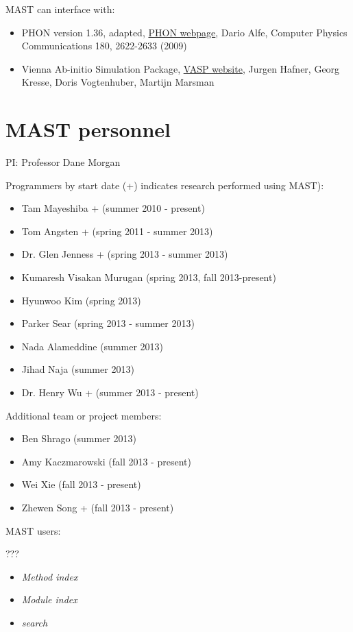 \documentclass[letterpaper,10pt,english]{sphinxmanual}
\begin{document}
MAST can interface with:
\begin{itemize}
\item {} 
PHON version 1.36, adapted, \href{http://www.homepages.ucl.ac.uk/~ucfbdxa/phon/phon.html}{PHON webpage}, Dario Alfe, Computer Physics Communications 180, 2622-2633 (2009)

\item {} 
Vienna Ab-initio Simulation Package, \href{https://www.vasp.at/}{VASP website}, Jurgen Hafner, Georg Kresse, Doris Vogtenhuber, Martijn Marsman

\end{itemize}


\chapter{MAST personnel}
\label{8_0_personnel::doc}\label{8_0_personnel:mast-personnel}
PI: Professor Dane Morgan

Programmers by start date (+) indicates research performed using MAST):
\begin{itemize}
\item {} 
Tam Mayeshiba + (summer 2010 - present)

\item {} 
Tom Angsten + (spring 2011 - summer 2013)

\item {} 
Dr. Glen Jenness + (spring 2013 - summer 2013)

\item {} 
Kumaresh Visakan Murugan (spring 2013, fall 2013-present)

\item {} 
Hyunwoo Kim (spring 2013)

\item {} 
Parker Sear (spring 2013 - summer 2013)

\item {} 
Nada Alameddine (summer 2013)

\item {} 
Jihad Naja (summer 2013)

\item {} 
Dr. Henry Wu + (summer 2013 - present)

\end{itemize}

Additional team or project members:
\begin{itemize}
\item {} 
Ben Shrago (summer 2013)

\item {} 
Amy Kaczmarowski (fall 2013 - present)

\item {} 
Wei Xie (fall 2013 - present)

\item {} 
Zhewen Song + (fall 2013 - present)

\end{itemize}

MAST users:

???
\begin{itemize}
\item {} 
\emph{Method index}

\item {} 
\emph{Module index}

\item {} 
\emph{search}

\end{itemize}



\renewcommand{\indexname}{Index}
\printindex
\end{document}
